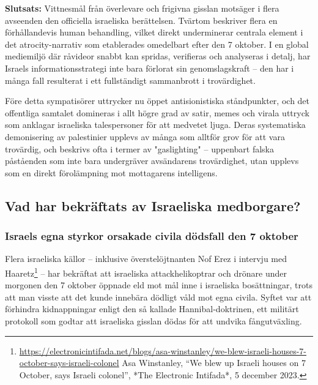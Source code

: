 \textbf{Slutsats:} Vittnesmål från överlevare och frigivna gisslan motsäger i flera avseenden den officiella israeliska berättelsen. Tvärtom beskriver flera en förhållandevis human behandling, vilket direkt underminerar centrala element i det atrocity-narrativ som etablerades omedelbart efter den 7 oktober. I en global mediemiljö där råvideor snabbt kan spridas, verifieras och analyseras i detalj, har Israels informationsstrategi inte bara förlorat sin genomslagskraft – den har i många fall resulterat i ett fullständigt sammanbrott i trovärdighet.

Före detta sympatisörer uttrycker nu öppet antisionistiska ståndpunkter, och det offentliga samtalet domineras i allt högre grad av satir, memes och virala uttryck som anklagar israeliska talespersoner för att medvetet ljuga. Deras systematiska demonisering av palestinier upplevs av många som alltför grov för att vara trovärdig, och beskrivs ofta i termer av "gaslighting" – uppenbart falska påståenden som inte bara undergräver avsändarens trovärdighet, utan upplevs som en direkt förolämpning mot mottagarens intelligens.



\subsection*{Vad har bekräftats av Israeliska medborgare?}

\subsubsection*{Israels egna styrkor orsakade civila dödsfall den 7 oktober}
Flera israeliska källor – inklusive överstelöjtnanten Nof Erez i intervju med Haaretz\footnote{\url{https://electronicintifada.net/blogs/asa-winstanley/we-blew-israeli-houses-7-october-says-israeli-colonel} Asa Winstanley, “We blew up Israeli houses on 7 October, says Israeli colonel”, *The Electronic Intifada*, 5 december 2023.}
 – har bekräftat att israeliska attackhelikoptrar och drönare under morgonen den 7 oktober öppnade eld mot mål inne i israeliska bosättningar, trots att man visste att det kunde innebära dödligt våld mot egna civila. Syftet var att förhindra kidnappningar enligt den så kallade Hannibal-doktrinen, ett militärt protokoll som godtar att israeliska gisslan dödas för att undvika fångutväxling.

